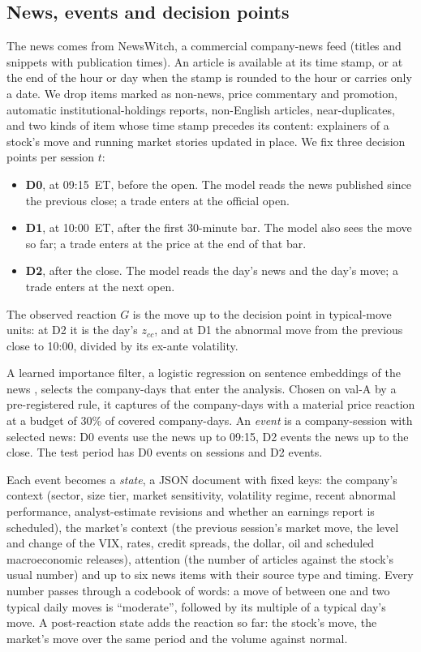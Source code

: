 \subsection{News, events and decision points}\label{sec:news}

The news comes from NewsWitch, a commercial company-news feed (titles and snippets with publication times). An
article is
available at its time stamp, or at the end of the hour or day when the stamp is rounded to the hour or carries
only a date. We drop items marked as non-news, price commentary and promotion, automatic institutional-holdings
reports, non-English articles, near-duplicates, and two kinds of item whose time stamp precedes its content:
explainers of a stock's move and running market stories updated in place. We fix three decision points per
session $t$:
\begin{itemize}[leftmargin=*, itemsep=1pt]
\item \textbf{D0}, at 09:15~ET, before the open. The model reads the news published since the previous close;
  a trade enters at the official open.
\item \textbf{D1}, at 10:00~ET, after the first 30-minute bar. The model also sees the move so far; a trade
  enters at the price at the end of that bar.
\item \textbf{D2}, after the close. The model reads the day's news and the day's move; a trade enters at the
  next open.
\end{itemize}
The observed reaction $G$ is the move up to the decision point in typical-move units: at D2 it is the day's
$z_{cc}$, and at D1 the abnormal move from the previous close to 10:00, divided by its ex-ante volatility.

A learned importance filter, a logistic regression on sentence embeddings of the news \citep{xiao2024}, selects
the company-days that enter the analysis. Chosen on val-A by a pre-registered rule, it captures 
of the company-days with a material price reaction at a budget of 30\% of covered company-days. An \emph{event}
is a company-session with selected news: D0 events use the news up to 09:15, D2 events the news up to the close.
The test period has  D0 events on  sessions and 
D2 events.

Each event becomes a \emph{state}, a JSON document with fixed keys: the company's context (sector, size tier,
market sensitivity, volatility regime, recent abnormal performance, analyst-estimate revisions and whether an
earnings report is scheduled), the market's context (the previous session's market move, the level and change
of the VIX, rates, credit spreads, the dollar, oil and scheduled macroeconomic releases), attention (the number
of articles against the stock's usual number) and up to six news items with their source type and timing. Every
number passes through a codebook of words: a move of between one and two typical daily moves is ``moderate'',
followed by its multiple of a typical day's move. A post-reaction state adds the reaction so far: the stock's
move, the market's move over the same period and the volume against normal.

